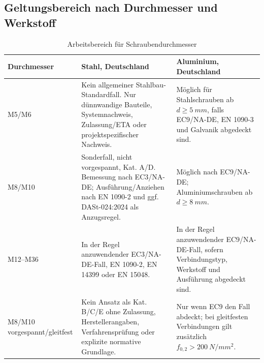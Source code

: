 \documentclass[10pt,a4paper]{article}
\begin{document}
\subsection{Geltungsbereich nach Durchmesser und Werkstoff}
\begin{table}[H]
\centering
\caption{Arbeitsbereich für Schraubendurchmesser}
\begin{tabularx}{\textwidth}{@{}p{28mm}YY@{}}
\toprule
\textbf{Durchmesser} & \textbf{Stahl, Deutschland} & \textbf{Aluminium, Deutschland} \\
\midrule
M5/M6 & Kein allgemeiner Stahlbau-Standardfall. Nur dünnwandige Bauteile, Systemnachweis, Zulassung/ETA oder projektspezifischer Nachweis. & Möglich für Stahlschrauben ab $d\geq\SI{5}{mm}$, falls EC9/NA-DE, EN 1090-3 und Galvanik abgedeckt sind. \\
M8/M10 & Sonderfall, nicht vorgespannt, Kat. A/D. Bemessung nach EC3/NA-DE; Ausführung/Anziehen nach EN 1090-2 und ggf. DASt-024:2024 als Anzugsregel. & Möglich nach EC9/NA-DE; Aluminiumschrauben ab $d\geq\SI{8}{mm}$. \\
M12--M36 & In der Regel anzuwendender EC3/NA-DE-Fall, EN 1090-2, EN 14399 oder EN 15048. & In der Regel anzuwendender EC9/NA-DE-Fall, sofern Verbindungstyp, Werkstoff und Ausführung abgedeckt sind. \\
M8/M10 vorgespannt/gleitfest & Kein Ansatz als Kat. B/C/E ohne Zulassung, Herstellerangaben, Verfahrensprüfung oder explizite normative Grundlage. & Nur wenn EC9 den Fall abdeckt; bei gleitfesten Verbindungen gilt zusätzlich $f_{0,2}>\SI{200}{N/mm^2}$. \\
\bottomrule
\end{tabularx}
\end{table}
\end{document}
